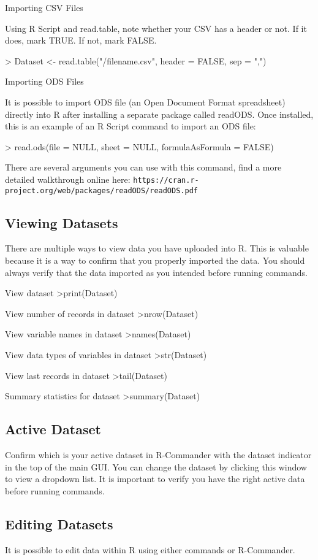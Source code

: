 Importing CSV Files

Using R Script and read.table, note whether your CSV has a header or not. If it does, mark TRUE. If not, mark FALSE.

> Dataset <-  read.table("/filename.csv", header = FALSE, sep = ",")

Importing ODS Files

It is possible to import ODS file (an Open Document Format spreadsheet) directly into R after installing a separate package called readODS. Once installed, this is an example of an R Script command to import an ODS file:

> read.ods(file = NULL, sheet = NULL, formulaAsFormula = FALSE)

There are several arguments you can use with this command, find a more detailed walkthrough online here: \texttt{https://cran.r-project.org/web/packages/readODS/readODS.pdf}

\subsection{Viewing Datasets}
There are multiple ways to view data you have uploaded into R. This is valuable because it is a way to confirm that you properly imported the data. You should always verify that the data imported as you intended before running commands.

View dataset
>print(Dataset)

View number of records in dataset
>nrow(Dataset)

View variable names in dataset
>names(Dataset)

View data types of variables in dataset
>str(Dataset)

View last records in dataset
>tail(Dataset)

Summary statistics for dataset
>summary(Dataset)

\subsection{Active Dataset}
Confirm which is your active dataset in R-Commander with the dataset indicator in the top of the main GUI. You can change the dataset by clicking this window to view a dropdown list. It is important to verify you have the right active data before running commands.

\subsection{Editing Datasets}
It is possible to edit data within R using either commands or R-Commander.